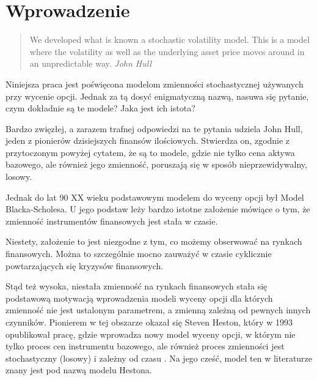 \documentclass{pracamgr}
\begin{document}
\tableofcontents
 



\chapter{Wprowadzenie}
\label{chap:introduction}


\begin{quote}
We developed what is known a stochastic volatility model. This is a model where the volatility as well as the underlying asset price moves around in an unpredictable way.
\raggedleft\slshape John Hull 
\end{quote}
Niniejsza praca jest poświęcona modelom zmienności stochastycznej używanych przy wycenie opcji. 
Jednak za tą dosyć enigmatyczną nazwą, nasuwa się pytanie, czym dokładnie są te modele? 
Jaka jest ich istota?

Bardzo zwięzłej, a zarazem trafnej odpowiedzi na te pytania udziela John Hull, 
jeden z pionierów dzisiejszych finansów ilościowych. Stwierdza on, zgodnie z przytoczonym 
powyżej cytatem, że są to modele, gdzie nie tylko cena aktywa bazowego, ale również jego zmienność, 
poruszają się w sposób nieprzewidywalny, losowy. 

Jednak do lat 90 XX wieku podstawowym modelem do wyceny opcji był Model Blacka-Scholesa. U jego podstaw 
leży bardzo istotne założenie mówiące o tym, że zmienność instrumentów finansowych jest stała w czasie. 

Niestety, założenie to jest niezgodne z tym, co możemy obserwować na rynkach finansowych. Można to szczególnie mocno zauważyć w czasie cyklicznie powtarzających się kryzysów finansowych.

Stąd też wysoka, niestała zmienność na rynkach finansowych stała się podstawową motywacją wprowadzenia modeli wyceny
opcji dla których zmienność nie jest ustalonym parametrem, a zmienną zależną od pewnych innych czynników. 
Pionierem w tej obszarze okazał się Steven Heston, który w 1993 opublikował pracę, gdzie wprowadza
nowy model wyceny opcji, w którym nie tylko proces cen instrumentu bazowego, ale również
proces zmienności jest stochastyczny (losowy) i zależny od czasu \cite{Heston}. Na jego cześć, model ten 
w literaturze znany jest pod nazwą modelu Hestona.
\end{document}
